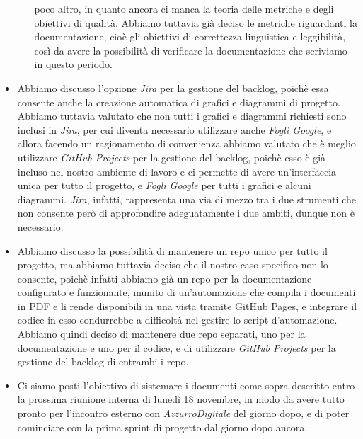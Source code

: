\begin{itemize}
\begin{itemize}
        poco altro, in quanto ancora ci manca la teoria delle metriche e degli obiettivi di qualità. Abbiamo tuttavia già deciso le metriche riguardanti la
        documentazione, cioè gli obiettivi di correttezza linguistica e leggibilità, così da avere la possibilità di verificare la documentazione che 
        scriviamo in questo periodo.
    \end{itemize}
    \item Abbiamo discusso l'opzione \emph{Jira} per la gestione del backlog, poichè essa consente anche la creazione automatica di grafici e diagrammi di
    progetto. Abbiamo tuttavia valutato che non tutti i grafici e diagrammi richiesti sono inclusi in \emph{Jira}, per cui diventa necessario utilizzare
    anche \emph{Fogli Google}, e allora facendo un ragionamento di convenienza abbiamo valutato che è meglio utilizzare \emph{GitHub Projects} per la gestione
    del backlog, poichè esso è già incluso nel nostro ambiente di lavoro e ci permette di avere un'interfaccia unica per tutto il progetto, e 
    \emph{Fogli Google} per tutti i grafici e alcuni diagrammi. \emph{Jira}, infatti, rappresenta una via di mezzo tra i due strumenti che non consente però
    di approfondire adeguatamente i due ambiti, dunque non è necessario.
    \item Abbiamo discusso la possibilità di mantenere un repo unico per tutto il progetto, ma abbiamo tuttavia deciso che il nostro caso specifico non lo
    consente, poichè infatti abbiamo già un repo per la documentazione configurato e funzionante, munito di un'automazione che compila i documenti in PDF
    e li rende disponibili in una vista tramite GitHub Pages, e integrare il codice in esso condurrebbe a difficoltà nel gestire lo script d'automazione.
    Abbiamo quindi deciso di mantenere due repo separati, uno per la documentazione e uno per il codice, e di utilizzare \emph{GitHub Projects} per la
    gestione del backlog di entrambi i repo.
    \item Ci siamo posti l'obiettivo di sistemare i documenti come sopra descritto entro la prossima riunione interna di lunedì 18 novembre, 
    in modo da avere tutto pronto per l'incontro esterno con \emph{AzzurroDigitale} del giorno dopo, e di poter cominciare con la prima sprint 
    di progetto dal giorno dopo ancora.
\end{itemize}